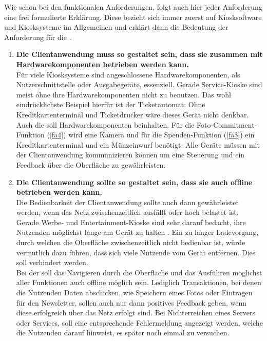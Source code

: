 Wie schon bei den funktionalen Anforderungen, folgt auch hier jeder Anforderung eine frei formulierte Erklärung. 
Diese bezieht sich immer zuerst auf Kiosksoftware und Kiosksysteme im Allgemeinen und erklärt dann die Bedeutung
der Anforderung für die \shst{}.

\begin{enumerate}[label=\textbf{NFA\arabic*}]
	\item\label{nfa1} \textbf{Die Clientanwendung muss so gestaltet sein, dass sie zusammen mit Hardwarekomponenten 
  betrieben werden kann.}\\
  Für viele Kiosksysteme sind angeschlossene Hardwarekomponenten, als Nutzerschnittstelle oder Ausgabegeräte, essenziell.
  Gerade Service-Kioske sind meist ohne ihre Hardwarekomponenten nicht zu benutzen. Das wohl eindrücklichste
  Beispiel hierfür ist der Ticketautomat: Ohne Kreditkartenterminal und Ticketdrucker wäre dieses Gerät nicht denkbar.\\
  Auch die \shst{} soll Hardwarekomponenten beinhalten. Für die Foto-Commitment-Funktion (\ref{fa4}) wird eine
  Kamera und für die Spenden-Funktion (\ref{fa3}) ein Kreditkartenterminal und ein Münzeinwurf benötigt. Alle 
  Geräte müssen mit der Clientanwendung kommunizieren können um eine Steuerung und ein Feedback über die Oberfläche
  zu gewährleisten. 
	\item\label{nfa2} \textbf{Die Clientanwendung sollte so gestaltet sein, dass sie auch offline 
  betrieben werden kann.}\\
  Die Bedienbarkeit der Clientanwendung sollte auch dann gewährleistet werden, wenn das Netz zwischenzeitlich
  ausfällt oder hoch belastet ist. Gerade Werbe- und Entertainment-Kioske sind sehr darauf bedacht, ihre
  Nutzenden möglichst lange am Gerät zu halten \cite{across}. Ein zu langer Ladevorgang, durch welchen die 
  Oberfläche zwischenzeitlich nicht bedienbar ist, würde vermutlich dazu führen, dass sich viele Nutzende 
  vom Gerät entfernen. Dies soll verhindert werden.\\
  Bei der \shst{} soll das Navigieren durch die Oberfläche und das Ausführen möglichst aller Funktionen 
  auch offline möglich sein. Lediglich Transaktionen, bei denen die Nutzenden Daten abschicken, wie Speichern 
  eines Fotos oder Eintragen für den Newsletter, sollen auch nur dann positives Feedback geben, wenn 
  diese erfolgreich über das Netz erfolgt sind. Bei Nichterreichen eines Servers oder Services, soll eine entsprechende
  Fehlermeldung angezeigt werden, welche die Nutzenden darauf hinweist, es später noch einmal zu versuchen.

\end{enumerate}
